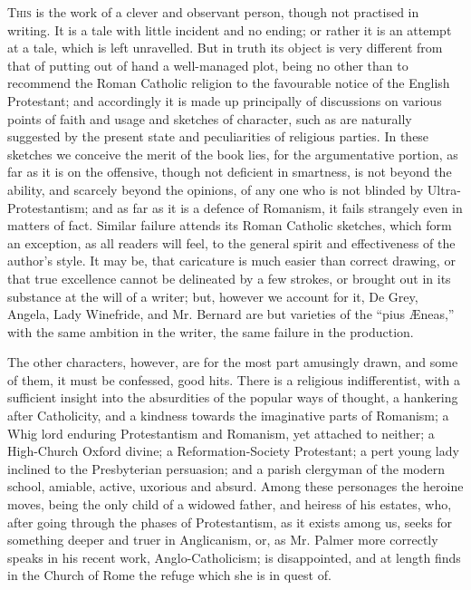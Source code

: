 T\textsc{his} is the work of a
clever and observant person, though not practised in writing. It is a
tale with little incident and no ending; or rather it is an attempt at a
tale, which is left unravelled. But in truth its object is very
different from that of putting out of hand a well-managed plot, being no
other than to recommend the Roman Catholic religion to the favourable
notice of the English Protestant; and accordingly it is made up principally of discussions on various points of faith and usage
and sketches of character, such as are naturally suggested by the
present state and peculiarities of religious parties. In these sketches
we conceive the merit of the book lies, for the argumentative portion,
as far as it is on the offensive, though not deficient in smartness, is
not beyond the ability, and scarcely beyond the opinions, of any one who
is not blinded by Ultra-Protestantism; and as far as it is a defence of
Romanism, it fails strangely even in matters of fact. Similar failure
attends its Roman Catholic sketches, which form an exception, as all
readers will feel, to the general spirit and effectiveness of the author's
style. It may be, that caricature is much easier than correct drawing,
or that true excellence cannot be delineated by a few strokes, or
brought out in its substance at the will of a writer; but, however we
account for it, De Grey, Angela, Lady Winefride, and Mr. Bernard are but
varieties of the ``pius Æneas,'' with the same ambition in the writer,
the same failure in the production.

The other characters, however, are for the most
part amusingly drawn, and some of them, it must be confessed, good hits.
There is a religious indifferentist, with a sufficient insight into the
absurdities of the popular ways of thought, a hankering after
Catholicity, and a kindness towards the imaginative parts of Romanism; a
Whig lord enduring Protestantism and Romanism, yet attached to neither;
a High-Church Oxford divine; a Reformation-Society Protestant; a pert
young lady inclined to the Presbyterian persuasion; and a parish
clergyman of the modern school, amiable, active, uxorious and absurd.
Among these personages the heroine moves, being the only child of a
widowed father, and heiress of his estates, who, after going through the
phases of Protestantism, as it exists among us, seeks for something
deeper and truer in Anglicanism, or, as Mr. Palmer more correctly speaks
in his recent work,
Anglo-Catholicism; is disappointed, and at length finds in the Church of
Rome the refuge which she is in quest of.

